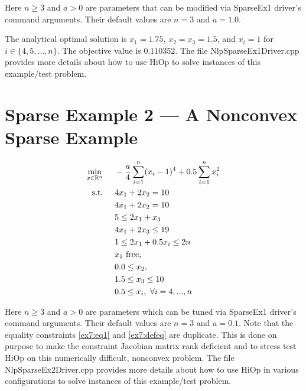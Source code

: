 \documentclass[11pt,letterpaper]{article}
\begin{document}
Here $n\geq3$ and $a>0$ are parameters that can be modified via SparseEx1 driver's command arguments. Their default values are $n=3$ and $a=1.0$.

The analytical optimal solution is  $x_1=1.75$, $x_2=x_3=1.5$, and $x_i=1$ for $i\in \{4,5,\ldots,n\}$. The objective value is $0.110352$. The file NlpSparseEx1Driver.cpp provides more details about how to use HiOp to solve instances of this example/test problem.

\section{Sparse Example 2 --- A Nonconvex Sparse Example}
\begin{align}
    &&&&\min_{x\in\mathbb{R}^n} & \hspace{0.5cm} -\frac{a}{4}\sum_{i=1}^{n} (x_i-1)^4 + 0.5\sum_{i=1}^{n} x_i^2&&&& \label{ex7:obj}\\
    &&&&\textnormal{s.t.} &\hspace{0.5cm}  4x_1+2x_2 = 10 &&&& \label{ex7:eq1}\\
    &&&&& \hspace{0.5cm}  4x_1+2x_2 = 10 &&&& \label{ex7:defeq}\\
    &&&&& \hspace{0.5cm}  5 \leq  2x_1 + x_3                 &&&& \label{ex7:ineq1}\\
    &&&&& \hspace{0.5cm}          4x_1      + 2x_3   \leq 19 &&&& \label{ex7:defineq}\\
    &&&&& \hspace{0.5cm}  1 \leq  2x_1      + 0.5x_i \leq 2n &&&& \label{ex7:ineq2}\\
    &&&&& \hspace{0.5cm}  x_1~\textnormal{free}, &&&& \label{ex7:varb1}\\
    &&&&& \hspace{0.5cm}  0.0 \leq x_2, &&&& \label{ex7:varb2}\\
    &&&&& \hspace{0.5cm}  1.5 \leq x_3 \leq 10  &&&& \label{ex7:varb3}\\
    &&&&& \hspace{0.5cm}  0.5 \leq x_i, \ \forall i=4,...,n    &&& \label{ex7:varb4}
\end{align}

Here $n\geq3$ and $a>0$ are parameters which can be tuned via SparseEx1 driver's command arguments. Their default values are  $n=3$ and $a=0.1$. Note that the equality constraints \eqref{ex7:eq1} and \eqref{ex7:defeq} are duplicate. This is done on purpose to make the constraint Jacobian matrix rank deficient and to stress test HiOp on this numerically difficult, nonconvex problem. The file NlpSparseEx2Driver.cpp provides more details about how to use HiOp in various configurations to solve instances of this example/test problem.


\end{document}
